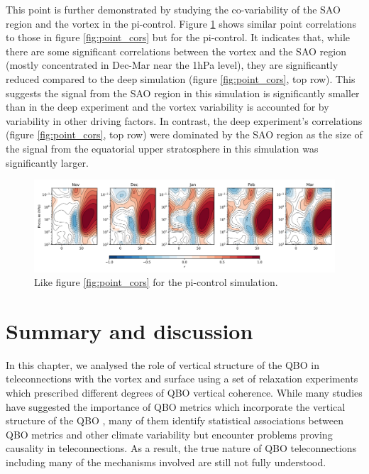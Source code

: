 This point is further demonstrated by studying the co-variability of the SAO region and the vortex in the pi-control. Figure \ref{fig:point_cors_picontrol} shows similar point correlations to those in figure \ref{fig:point_cors} but for the pi-control. It indicates that, while there are some significant correlations between the vortex and the SAO region (mostly concentrated in Dec-Mar near the 1hPa level), they are significantly reduced compared to the deep simulation (figure \ref{fig:point_cors}, top row). This suggests the signal from the SAO region in this simulation is significantly smaller than in the deep experiment and the vortex variability is accounted for by variability in other driving factors. In contrast, the deep experiment's correlations (figure \ref{fig:point_cors}, top row) were dominated by the SAO region as the size of the signal from the  equatorial upper stratosphere in this simulation was significantly larger. 

\begin{figure}[h!]
\begin{center}
\noindent\includegraphics[width = \linewidth]{Figures/Figures-deepQBO/point_correlations_ZMZW_picontrol_60N_10hPa.png}
\caption[Point correlations between vortex ZMZWs and winds at other points in the pi-control simulation]{Like figure \ref{fig:point_cors} for the pi-control simulation.}
\label{fig:point_cors_picontrol}
\end{center}
\end{figure}

\section{Summary and discussion}
In this chapter, we analysed the role of vertical structure of the QBO in teleconnections with the vortex and surface using a set of relaxation experiments which prescribed different degrees of QBO vertical coherence. While many studies have suggested the importance of QBO metrics which incorporate the vertical structure of the QBO \citep{schenzingerDefining2017, graySurface2018b, andrewsObserved2019d}, many of them identify statistical associations between QBO metrics and other climate variability but encounter problems proving causality in teleconnections. As a result, the true nature of QBO teleconnections including many of the mechanisms involved are still not fully understood. 

